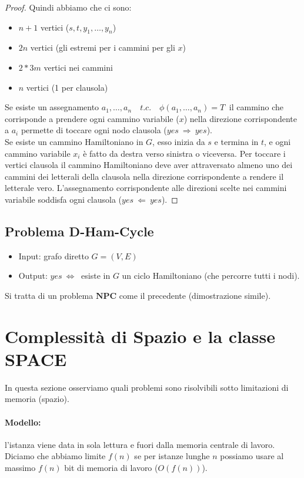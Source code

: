 \documentclass[a4paper]{article}
\theoremstyle{definition}
\newcommand{\npc}{\mathbf{NPC}}
\begin{document}
\begin{proof}
				Quindi abbiamo che ci sono:
				\begin{itemize}
					\item $ n + 1 $ vertici ($ s, t, y_1, \dots, y_n $)
					\item $ 2n $ vertici (gli estremi per i cammini per gli $ x $)
					\item $ 2 * 3m $ vertici nei cammini
					\item $ n $ vertici (1 per clausola)
				\end{itemize}
				Se esiste un assegnamento $ a_1, \dots, a_n\quad t.c.\quad \phi(a_1, \dots, a_n) = T\ $ il cammino che corrisponde a prendere ogni cammino variabile ($ x $) nella direzione corrispondente a $ a_i $ permette di toccare ogni nodo clausola ($ yes\ \Rightarrow\ yes $).\\
				
				\noindent
				Se esiste un cammino Hamiltoniano in $ G $, esso inizia da $ s $ e termina in $ t $, e ogni cammino variabile $ x_i $ è fatto da destra verso sinistra o viceversa. Per toccare i vertici clausola il cammino Hamiltoniano deve aver attraversato almeno uno dei cammini dei letterali della clausola nella direzione corrispondente a rendere il letterale vero. L'assegnamento corrispondente alle direzioni scelte nei cammini variabile soddisfa ogni clausola ($ yes\ \Leftarrow\ yes $).
 				
			\end{proof}
		
		\subsection*{Problema D-Ham-Cycle}
		\begin{itemize}
			\item Input: grafo diretto $ G = (V, E) $
			\item Output: $ yes\ \Leftrightarrow\ $ esiste in $ G $ un ciclo Hamiltoniano (che percorre tutti i nodi).
		\end{itemize}
	
	\noindent
	Si tratta di un problema $\npc$ come il precedente (dimostrazione simile).
			
		\newpage
	\section{Complessità di Spazio e la classe SPACE}
		In questa sezione osserviamo quali problemi sono risolvibili sotto limitazioni di memoria (spazio).
		\paragraph{Modello:} l'istanza viene data in sola lettura e fuori dalla memoria centrale di lavoro. Diciamo che abbiamo limite $ f(n) $ se per istanze lunghe $ n $ possiamo usare al massimo $ f(n) $ bit di memoria di lavoro ($ O(f(n)) $).
		
\end{document}
